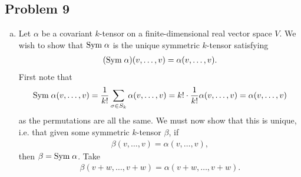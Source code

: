 \documentclass{../../mathnotes}
\begin{document}
\subsection*{Problem 9}

\begin{enumerate}[(a)]
    \item Let $\alpha$ be a covariant $k$-tensor on a finite-dimensional real vector space $V$. We wish to show that
        $\text{Sym\;}\alpha$ is the unique symmetric $k$-tensor satisfying
        \begin{align*}
            (\text{Sym\;}\alpha)(v,\ldots,v)=\alpha(v,\ldots, v).
        \end{align*}
        First note that 
        \[\text{Sym\;}\alpha(v,\ldots,v)=\frac{1}{k!}\sum_{\sigma\in S_k}\alpha(v,\ldots, v)=k!\cdot\frac{1}{k!}\alpha(v,\ldots,v)=\alpha(v,\ldots, v)\]
        as the permutations are all the same. We must now show that this is unique, i.e. that given some symmetric $k$-tensor $\beta$, if
        \begin{align*}
            \beta(v,\ldots,v)=\alpha(v,\ldots, v),
        \end{align*}
        then $\beta=\text{Sym\;}\alpha$. Take
        \begin{align*}
            \beta(v+w,\ldots,v+w)=\alpha(v+w,\ldots,v+w).
        \end{align*}
        

\end{enumerate}
\end{document}
